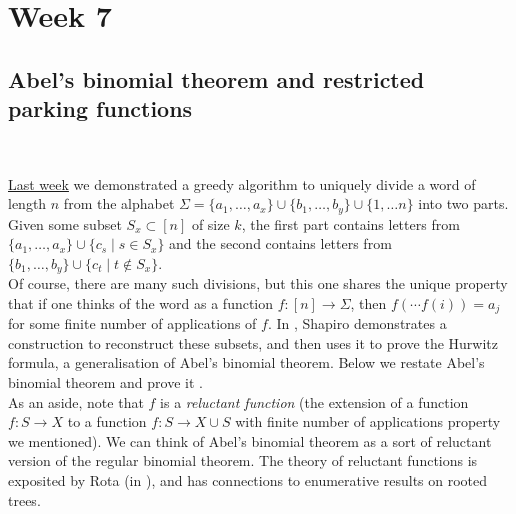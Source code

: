 \section{Week 7}

\subsection*{Abel's binomial theorem and restricted parking functions}~

\hyperref[ss: abel6]{Last week} we demonstrated a greedy algorithm to uniquely divide a word of length $n$ from the alphabet $\Sigma = \{ a_{1}, \dots, a_{x} \} \cup \{ b_{1}, \dots, b_{y} \} \cup \{ 1, \dots n \}$ into two parts. Given some subset $S_{x} \subset [n]$ of size $k$, the first part contains letters from $\{ a_{1}, \dots, a_{x} \} \cup \{ c_{s} \mid s \in S_{x} \}$ and the second contains letters from $\{ b_{1}, \dots, b_{y} \} \cup \{ c_{t} \mid t \notin S_{x} \}$. \\

Of course, there are many such divisions, but this one shares the unique property that if one thinks of the word as a function $f : [n] \to \Sigma$, then $f(\cdots f(i)) = a_{j}$ for some finite number of applications of $f$. In \cite{shapiro-1991}, Shapiro demonstrates a construction to reconstruct these subsets, and then uses it to prove the Hurwitz formula, a generalisation of Abel's binomial theorem. Below we restate Abel's binomial theorem and prove it . \\

As an aside, note that $f$ is a \emph{reluctant function} (the extension of a function $f : S \to X$ to a function $f : S \to X \cup S$ with finite number of applications property we mentioned). We can think of Abel's binomial theorem as a sort of reluctant version of the regular binomial theorem. The theory of reluctant functions is exposited by Rota (in \cite{rota-foundations3-1970}), and has connections to enumerative results on rooted trees.

\abelsbin*

